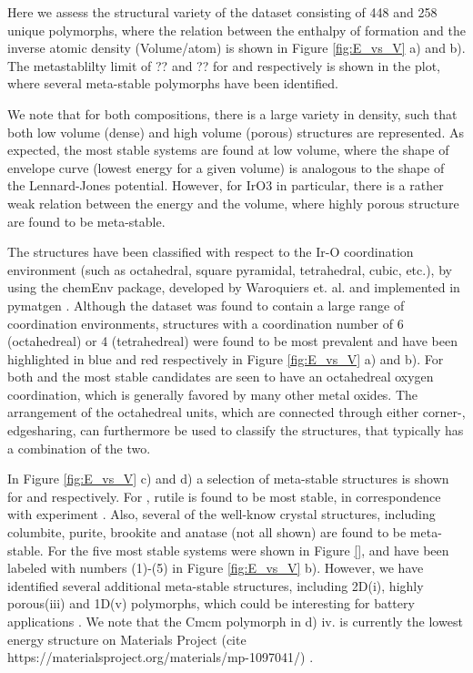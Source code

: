 %
Here we assess the structural variety of the dataset consisting of 448 \IrOtwo and 258 \IrOthree unique polymorphs, where the relation between the enthalpy of formation and the inverse atomic density (Volume/atom) is shown in Figure \ref{fig:E_vs_V} a) and b). The metastablilty limit of ?? and ?? for \IrOtwo and \IrOthree respectively is shown in the plot, where several meta-stable polymorphs have been identified.

We note that for both compositions, there is a large variety in density, such that both low volume (dense) and high volume (porous) structures are represented. As expected, the most stable systems are found at low volume, where the shape of envelope curve (lowest energy for a given volume) is analogous to the shape of the Lennard-Jones potential. However, for IrO3 in particular, there is a rather weak relation between the energy and the volume, where highly porous structure are found to be meta-stable.

The structures have been classified with respect to the Ir-O coordination environment (such as octahedral, square pyramidal, tetrahedral, cubic, etc.), by using the chemEnv package, developed by Waroquiers et. al. \cite{Waroquiers2017} and implemented in pymatgen \cite{Ong2013}. Although the dataset was found to contain a large range of coordination environments, structures with a coordination number of 6 (octahedreal) or 4 (tetrahedreal) were found to be most prevalent and have been highlighted in blue and red respectively in Figure \ref{fig:E_vs_V} a) and b). For both \IrOtwo and \IrOthree the most stable candidates are seen to have an octahedreal oxygen coordination, which is generally favored by many other metal oxides. \cite{Waroquiers2017} The arrangement of the octahedreal units, which are connected through either corner-, edgesharing, can furthermore be used to classify the structures, that typically has a combination of the two. 

In Figure \ref{fig:E_vs_V} c) and d) a selection of meta-stable structures is shown for \IrOtwo and \IrOthree respectively. For \IrOtwo, rutile is found to be most stable, in correspondence with experiment \cite{}. Also, several of the well-know crystal structures, including  columbite, purite, brookite and anatase (not all shown) are found to be meta-stable.
For \IrOthree the five most stable systems were shown in Figure \ref{}, and have been labeled with numbers (1)-(5) in Figure \ref{fig:E_vs_V} b). However, we have identified several additional meta-stable structures, including 2D(i), highly porous(iii) and 1D(v) polymorphs, which could be interesting for battery applications \cite{}. We note that the Cmcm polymorph in d) iv. is currently the lowest energy structure on Materials Project (cite https://materialsproject.org/materials/mp-1097041/) \cite{}.





